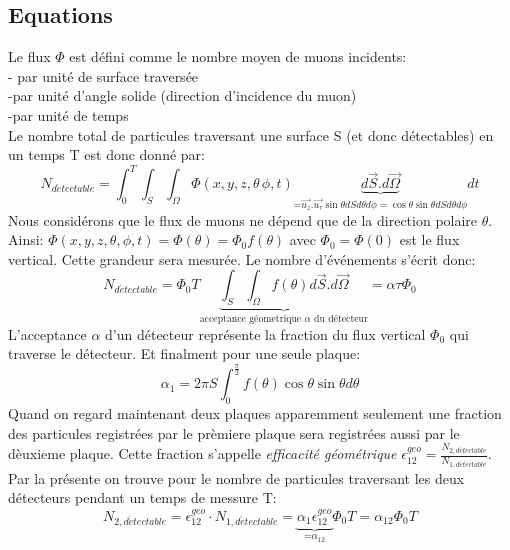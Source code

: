 \documentclass[a4paper,11pt,liststotocnumbered,bibtotocnumbered]{scrartcl}
\begin{document}
  \subsection{Equations} 
  Le flux $\Phi$ est défini comme le nombre moyen de muons incidents:\\
- par unité de surface traversée\\
-par unité d'angle solide (direction d'incidence du muon)\\
-par unité de temps\\
Le nombre total de particules traversant une surface S (et donc détectables) en un temps T est donc donné par:
\begin{equation*}
N_{d\acute etectable}=\int_0^T \int_S \int_{\Omega} \Phi(x,y,z,\theta \,\phi,t) \underbrace{d\vec{S}.d\vec{\Omega}}_{\text{=$\vec{u_z}.\vec{u_r}\sin\theta dS d\theta d\phi=\cos\theta \sin\theta dS d\theta d\phi$}}dt
\end{equation*}
Nous considérons que le flux de muons ne dépend que de la direction polaire $\theta$. Ainsi: $\Phi(x,y,z,\theta,\phi,t) = \Phi(\theta)=\Phi_0f(\theta)$ avec $\Phi_0=\Phi(0)$ est le flux vertical. Cette grandeur sera mesurée. Le nombre d'événements s'écrit donc: 
\begin{equation*}
N_{d\acute etectable}=\Phi_0 T\underbrace{ \int_S \int_{\Omega} f(\theta) d\vec{S}.d\vec{\Omega}}_{\text{acceptance géometrique $\alpha$ du détecteur}}=\alpha \tau \Phi_0
\end{equation*}
L'acceptance $\alpha$ d'un détecteur représente la fraction du flux vertical $\Phi_0$ qui traverse le détecteur.
Et finalment pour une seule plaque:
\begin{equation*}
\alpha_1=2\pi S\int_0^{\frac{\pi}{2}}f(\theta)\cos\theta \sin\theta d \theta
\end{equation*}
Quand on regard maintenant deux plaques apparemment seulement une fraction des particules registrées par le prèmiere plaque sera registrées aussi par le dèuxieme plaque. Cette fraction s'appelle \emph{efficacité géométrique } $\epsilon_{12}^{geo}=\frac{N_{2,d\acute etectable}}{N_{1,d\acute etectable}}$. Par la présente on trouve pour le nombre de particules traversant les deux détecteurs pendant un temps de messure T:
\begin{equation*}
N_{2,d\acute etectable}=\epsilon_{12}^{geo}\cdot N_{1,d\acute etectable}=\underbrace{\alpha_1 \epsilon_{12}^{geo}}_{\text{=$\alpha_{12}$}}\Phi_0 T=\alpha_{12}\Phi_0 T
\end{equation*}\\
\end{document}

